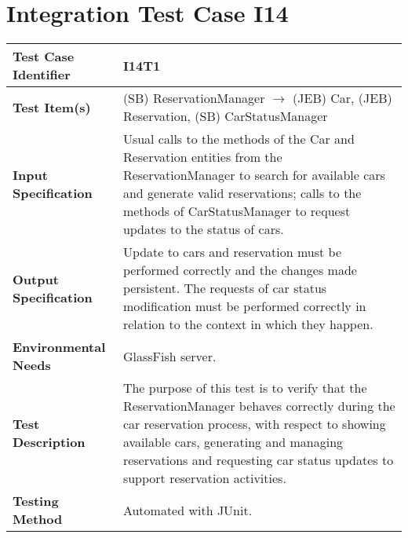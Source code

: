 \section{Integration Test Case I14}

\begin{longtable}{p{} | p{}}
\hline
\textbf{Test Case Identifier} & I14T1\\
\hline
\textbf{Test Item(s)} & (SB) ReservationManager $\rightarrow$ (JEB) Car, (JEB) Reservation, (SB) CarStatusManager \\
\hline
\textbf{Input Specification} & Usual calls to the methods of the Car and Reservation entities from the ReservationManager to search for available cars and generate valid reservations; calls to the methods of CarStatusManager to request updates to the status of cars. \\
\hline
\textbf{Output Specification} & Update to cars and reservation must be performed correctly and the changes made persistent. The requests of car status modification must be performed correctly in relation to the context in which they happen. \\
\hline
\textbf{Environmental Needs} & GlassFish server. \\
\hline
\textbf{Test Description} & The purpose of this test is to verify that the ReservationManager behaves correctly during the car reservation process, with respect to showing available cars, generating and managing reservations and requesting car status updates to support reservation activities. \\
\hline
\textbf{Testing Method} & Automated with JUnit. \\
\hline
\end{longtable}

